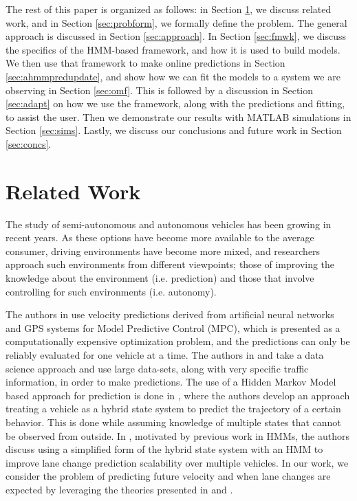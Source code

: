 \documentclass[letterpaper, 10 pt, conference]{ieeeconf}  %
\newcommand\NB[1]{$\spadesuit$\footnote{NB: #1}}
\begin{document}
    The rest of this paper is organized as follows: in Section \ref{sec:relatedwork}, we discuss related work, and in Section \ref{sec:probform}, we formally define the problem. The general approach is discussed in Section \ref{sec:approach}. In Section \ref{sec:fmwk}, we discuss the specifics of the HMM-based framework, and how it is used to build models. We then use that framework to make online predictions in Section \ref{sec:ahmmpredupdate}, and show how we can fit the models to a system we are observing in Section \ref{sec:omf}. This is followed by a discussion in Section \ref{sec:adapt} on how we use the framework, along with the predictions and fitting, to assist the user. Then we demonstrate our results with MATLAB simulations in Section \ref{sec:sims}. Lastly, we discuss our conclusions and future work in Section \ref{sec:concs}.%

    

\section{Related Work} \label{sec:relatedwork}

The study of semi-autonomous and autonomous vehicles has been growing in recent years. As these options have become more available to the average consumer, driving environments have become more mixed, and researchers approach such environments from different viewpoints; those of improving the knowledge about the environment (i.e. prediction) and those that involve controlling for such environments (i.e. autonomy).

The authors in \cite{mpc} use velocity predictions derived from artificial neural networks and GPS systems for Model Predictive Control (MPC), which is presented as a computationally expensive optimization problem, and the predictions can only be reliably evaluated for one vehicle at a time. The authors in \cite{velnn} and \cite{veldatadriv} take a data science approach and use large data-sets, along with very specific traffic information, in order to make predictions. The use of a Hidden Markov Model based approach for prediction is done in \cite{lanhmm}, where the authors develop an approach treating a vehicle as a hybrid state system to predict the trajectory of a certain behavior. This is done while assuming knowledge of multiple states that cannot be observed from outside. In \cite{woohmm}, motivated by previous work in HMMs, the authors discuss using a simplified form of the hybrid state system with an HMM to improve lane change prediction scalability over multiple vehicles. In our work, we consider the problem of predicting future velocity and when lane changes are expected by leveraging the theories presented in \cite{mpc} and \cite{woohmm}. 
\end{document}
